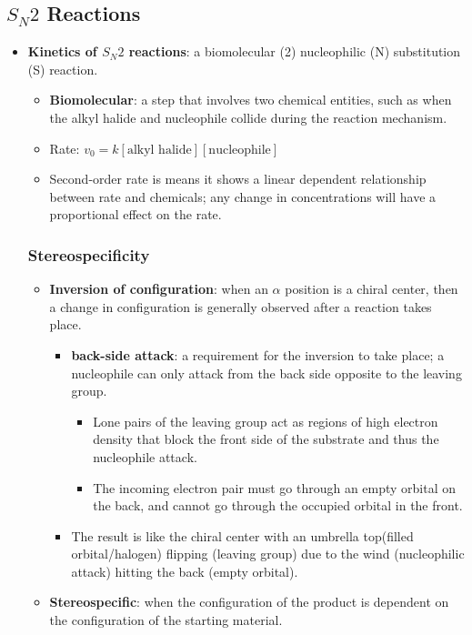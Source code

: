 \documentclass[12pt,a4paper]{article}
\begin{document}
\subsection{\texorpdfstring{\(S_N2\)}{Lg} Reactions}
\begin{itemize}
    \item \textbf{Kinetics of \(S_N2\) reactions}: a biomolecular (2) nucleophilic (N) substitution (S) reaction. 
        \begin{itemize}
            \item \textbf{Biomolecular}: a step that involves two chemical entities, such as when the alkyl halide and nucleophile collide during the reaction mechanism. 
            \item Rate: \(v_0 = k[\text{alkyl halide}][\text{nucleophile}]\)
            \item Second-order rate is means it shows a linear dependent relationship between rate and chemicals; any change in concentrations will have a proportional effect on the rate.
        \end{itemize}
    \subsubsection{Stereospecificity}
        \begin{itemize}
            \item \textbf{Inversion of configuration}: when an $\alpha$ position is a chiral center, then a change in configuration is generally observed after a reaction takes place.
                \begin{itemize}
                    \item \textbf{back-side attack}: a requirement for the inversion to take place; a nucleophile can only attack from the back side opposite to the leaving group.
                        \begin{itemize}
                            \item Lone pairs of the leaving group act as regions of high electron density that block the front side of the substrate and thus the nucleophile attack.
                            \item The incoming electron pair must go through an empty orbital on the back, and cannot go through the occupied orbital in the front.
                        \end{itemize}
                    \item The result is like the chiral center with an umbrella top(filled orbital/halogen) flipping (leaving group) due to the wind (nucleophilic attack) hitting the back (empty orbital).
                \end{itemize}
            \item \textbf{Stereospecific}: when the configuration of the product is dependent on the configuration of the starting material.
        \end{itemize}

\end{itemize}
\end{document}
